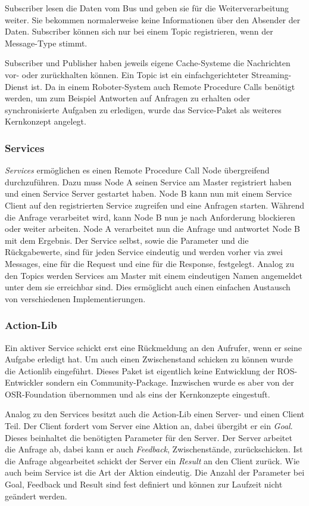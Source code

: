 Subscriber lesen die Daten vom Bus und geben sie für die Weiterverarbeitung weiter. Sie bekommen normalerweise keine Informationen über den Absender der Daten. Subscriber können sich nur bei einem Topic registrieren, wenn der Message-Type stimmt.

Subscriber und Publisher haben jeweils eigene Cache-Systeme die Nachrichten vor- oder zurückhalten können. Ein Topic ist ein einfachgerichteter Streaming-Dienst ist. Da in einem Roboter-System auch Remote Procedure Calls benötigt werden, um zum Beispiel Antworten auf Anfragen zu erhalten oder synchronisierte Aufgaben zu erledigen, wurde das Service-Paket als weiteres Kernkonzept angelegt.

\subsubsection{Services}

\textit{Services} ermöglichen es einen Remote Procedure Call Node übergreifend durchzuführen. Dazu muss Node A seinen Service am Master registriert haben und einen Service Server gestartet haben. Node B kann nun mit einem Service Client auf den registrierten Service zugreifen und eine Anfragen starten. Während die Anfrage verarbeitet wird, kann Node B nun je nach Anforderung blockieren oder weiter arbeiten. Node A verarbeitet nun die Anfrage und antwortet Node B mit dem Ergebnis. Der Service selbst, sowie die Parameter und die Rückgabewerte, sind für jeden Service eindeutig und werden vorher via zwei Messages, eine für die Request und eine für die Response, festgelegt. Analog zu den Topics werden Services am Master mit einem eindeutigen Namen angemeldet unter dem sie erreichbar sind. Dies ermöglicht auch einen einfachen Austausch von verschiedenen Implementierungen.

\subsubsection{Action-Lib}
\label{sec:basic-ros-action}
Ein aktiver Service schickt erst eine Rückmeldung an den Aufrufer, wenn er seine Aufgabe erledigt hat. Um auch einen Zwischenstand schicken zu können wurde die Actionlib eingeführt. Dieses Paket ist eigentlich keine Entwicklung der ROS-Entwickler sondern ein Community-Package. Inzwischen wurde es aber von der OSR-Foundation übernommen und als eins der Kernkonzepte eingestuft.

Analog zu den Services besitzt auch die Action-Lib einen Server- und einen Client Teil. Der Client fordert vom Server eine Aktion an, dabei übergibt er ein \textit{Goal}. Dieses beinhaltet die benötigten Parameter für den Server. Der Server arbeitet die Anfrage ab, dabei kann er auch \textit{Feedback}, Zwischenstände, zurückschicken. Ist die Anfrage abgearbeitet schickt der Server ein \textit{Result} an den Client zurück. Wie auch beim Service ist die Art der Aktion eindeutig. Die Anzahl der Parameter bei Goal, Feedback und Result sind fest definiert und können zur Laufzeit nicht geändert werden.